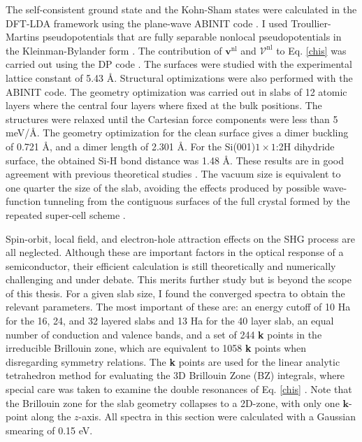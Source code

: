 {The self-consistent ground state and the Kohn-Sham states were calculated in the
DFT-LDA framework using the plane-wave ABINIT code \cite{gonzeCPS09, abinit}. I
used Troullier-Martins pseudopotentials \cite{troullierPRB91} that are fully
separable nonlocal pseudopotentials in the Kleinman-Bylander form
\cite{kleinmanPRL82}. The contribution of $\mathbf{v}^\mathrm{nl}$ and
$\boldsymbol{\mathcal{V}}^\mathrm{nl}$ to Eq. \eqref{chis} was carried out using
the DP code \cite{olevanoDP}. The surfaces were studied with the experimental
lattice constant of 5.43 \AA. Structural optimizations were also performed with
the ABINIT code. The geometry optimization was carried out in slabs of 12 atomic
layers where the central four layers where fixed at the bulk positions. The
structures were relaxed until the Cartesian force components were less than 5
meV/\AA. The geometry optimization for the clean surface gives a dimer buckling
of 0.721 \AA, and a dimer length of 2.301 \AA. For the Si(001)$1\times 1$:2H
dihydride surface, the obtained Si-H bond distance was 1.48 \AA. These results
are in good agreement with previous theoretical studies
\cite{caramellaPRB09,mendozaPRB06}. The vacuum size is equivalent to one quarter
the size of the slab, avoiding the effects produced by possible wave-function
tunneling from the contiguous surfaces of the full crystal formed by the
repeated super-cell scheme \cite{mendozaPRB06}.

Spin-orbit, local field, and electron-hole attraction \cite{beyond} effects on
the SHG process are all neglected. Although these are important factors in the
optical response of a semiconductor, their efficient calculation is still
theoretically and numerically challenging and under debate. This merits further
study but is beyond the scope of this thesis. For a given slab size, I found the
converged spectra to obtain the relevant parameters. The most important of these
are: an energy cutoff of 10 Ha for the 16, 24, and 32 layered slabs and 13 Ha
for the 40 layer slab, an equal number of conduction and valence bands, and a
set of 244 \textbf{k} points in the irreducible Brillouin zone, which are
equivalent to 1058 \textbf{k} points when disregarding symmetry relations. The
\textbf{k} points are used for the linear analytic tetrahedron method for
evaluating the 3D Brillouin Zone (BZ) integrals, where special care was taken to
examine the double resonances of Eq. \eqref{chis} \cite{nastosPRB05}. Note that
the Brillouin zone for the slab geometry collapses to a 2D-zone, with only one
$\mathbf{k}$-point along the $z$-axis. All spectra in this section were
calculated with a Gaussian smearing of 0.15 eV.

}
